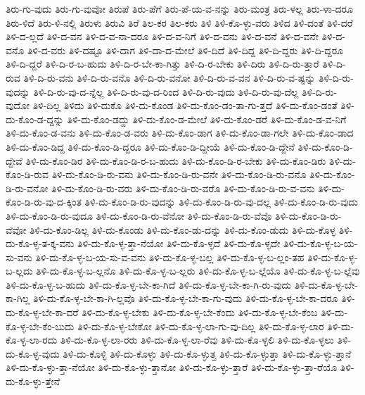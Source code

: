 {ತಿರು-ಗು-ವುದು
ತಿರು-ಗು-ವುವೋ
ತಿರುಪೆ
ತಿರು-ಪೆಗೆ
ತಿರು-ಪೆ-ಯ-ವ-ನನ್ನು
ತಿರು-ಮಂತ್ರ
ತಿರು-ಳಲ್ಲ
ತಿರು-ಳಾ-ದರೂ
ತಿರು-ಳಿದೆ
ತಿರು-ಳಿ-ನಲ್ಲಿ
ತಿರುಳು
ತಿರುವಿ
ತಿರೆ
ತಿಲ-ಕರ
ತಿಲ-ಕರು
ತಿಳಿ
ತಿಳಿ-ಕೊ-ಳ್ಳು-ವರು
ತಿಳಿದ
ತಿಳಿ-ದಂತೆ
ತಿಳಿ-ದರೆ
ತಿಳಿ-ದ-ಲ್ಲದೆ
ತಿಳಿ-ದ-ವನ
ತಿಳಿ-ದ-ವ-ನಾ-ದರೂ
ತಿಳಿ-ದ-ವ-ನಿಗೆ
ತಿಳಿ-ದ-ವನು
ತಿಳಿ-ದ-ವನೆ
ತಿಳಿ-ದ-ವನೇ
ತಿಳಿ-ದ-ವನೊ
ತಿಳಿ-ದ-ವರು
ತಿಳಿ-ದಷ್ಟೂ
ತಿಳಿ-ದಾಗ
ತಿಳಿ-ದಾ-ದ-ಮೇಲೆ
ತಿಳಿ-ದಿದೆ
ತಿಳಿ-ದಿದ್ದ
ತಿಳಿ-ದಿ-ದ್ದರು
ತಿಳಿ-ದಿ-ದ್ದರೂ
ತಿಳಿ-ದಿ-ದ್ದರೆ
ತಿಳಿ-ದಿ-ರ-ಬ-ಹುದು
ತಿಳಿ-ದಿ-ರ-ಬೇ-ಕಾ-ಗಿತ್ತು
ತಿಳಿ-ದಿ-ರ-ಬೇಕು
ತಿಳಿ-ದಿರು
ತಿಳಿ-ದಿ-ರು-ತ್ತಾರೆ
ತಿಳಿ-ದಿ-ರುವ
ತಿಳಿ-ದಿ-ರು-ವನು
ತಿಳಿ-ದಿ-ರು-ವನೊ
ತಿಳಿ-ದಿ-ರು-ವನೋ
ತಿಳಿ-ದಿ-ರು-ವ-ವನ
ತಿಳಿ-ದಿ-ರು-ವ-ಷ್ಟನ್ನು
ತಿಳಿ-ದಿ-ರು-ವುದನ್ನು
ತಿಳಿ-ದಿ-ರು-ವು-ದ-ನ್ನೆಲ್ಲ
ತಿಳಿ-ದಿ-ರು-ವು-ದ-ರಿಂದ
ತಿಳಿ-ದಿ-ರು-ವುದು
ತಿಳಿ-ದಿ-ರು-ವು-ದೆಲ್ಲ
ತಿಳಿ-ದಿ-ರು-ವುದೋ
ತಿಳಿ-ದಿಲ್ಲ
ತಿಳಿದು
ತಿಳಿ-ದುಕೊ
ತಿಳಿ-ದು-ಕೊಂಡ
ತಿಳಿ-ದು-ಕೊಂ-ಡಂ-ತಾ-ಗು-ತ್ತದೆ
ತಿಳಿ-ದು-ಕೊಂ-ಡಂತೆ
ತಿಳಿ-ದು-ಕೊಂ-ಡ-ದ್ದನ್ನು
ತಿಳಿ-ದು-ಕೊಂ-ಡದ್ದು
ತಿಳಿ-ದು-ಕೊಂ-ಡ-ಮೇಲೆ
ತಿಳಿ-ದು-ಕೊಂ-ಡರೆ
ತಿಳಿ-ದು-ಕೊಂ-ಡ-ವ-ನಿಗೆ
ತಿಳಿ-ದು-ಕೊಂ-ಡ-ವನು
ತಿಳಿ-ದು-ಕೊಂ-ಡ-ವರು
ತಿಳಿ-ದು-ಕೊಂ-ಡಾಗ
ತಿಳಿ-ದು-ಕೊಂ-ಡಾ-ಗಲೇ
ತಿಳಿ-ದು-ಕೊಂ-ಡಾದ
ತಿಳಿ-ದು-ಕೊಂ-ಡಿದ್ದ
ತಿಳಿ-ದು-ಕೊಂ-ಡಿ-ದ್ದರೂ
ತಿಳಿ-ದು-ಕೊಂ-ಡಿ-ದ್ದೀಯೆ
ತಿಳಿ-ದು-ಕೊಂ-ಡಿ-ದ್ದೇನೆ
ತಿಳಿ-ದು-ಕೊಂ-ಡಿ-ದ್ದೇವೆ
ತಿಳಿ-ದು-ಕೊಂ-ಡಿರ
ತಿಳಿ-ದು-ಕೊಂ-ಡಿ-ರ-ಬ-ಹುದು
ತಿಳಿ-ದು-ಕೊಂ-ಡಿ-ರ-ಬೇಕು
ತಿಳಿ-ದು-ಕೊಂ-ಡಿರು
ತಿಳಿ-ದು-ಕೊಂ-ಡಿ-ರುವ
ತಿಳಿ-ದು-ಕೊಂ-ಡಿ-ರು-ವನು
ತಿಳಿ-ದು-ಕೊಂ-ಡಿ-ರು-ವನೇ
ತಿಳಿ-ದು-ಕೊಂ-ಡಿ-ರು-ವನೊ
ತಿಳಿ-ದು-ಕೊಂ-ಡಿ-ರು-ವನೋ
ತಿಳಿ-ದು-ಕೊಂ-ಡಿ-ರು-ವರು
ತಿಳಿ-ದು-ಕೊಂ-ಡಿ-ರು-ವರೊ
ತಿಳಿ-ದು-ಕೊಂ-ಡಿ-ರು-ವ-ವನು
ತಿಳಿ-ದು-ಕೊಂ-ಡಿ-ರು-ವು-ದ-ಕ್ಕಿಂತ
ತಿಳಿ-ದು-ಕೊಂ-ಡಿ-ರು-ವುದನ್ನು
ತಿಳಿ-ದು-ಕೊಂ-ಡಿ-ರು-ವು-ದಲ್ಲ
ತಿಳಿ-ದು-ಕೊಂ-ಡಿ-ರು-ವುದು
ತಿಳಿ-ದು-ಕೊಂ-ಡಿ-ರು-ವುದೂ
ತಿಳಿ-ದು-ಕೊಂ-ಡಿ-ರು-ವೆನೋ
ತಿಳಿ-ದು-ಕೊಂ-ಡಿ-ರು-ವೆವೊ
ತಿಳಿ-ದು-ಕೊಂ-ಡಿ-ರು-ವೆವೋ
ತಿಳಿ-ದು-ಕೊಂ-ಡಿಲ್ಲ
ತಿಳಿ-ದು-ಕೊಂಡು
ತಿಳಿ-ದು-ಕೊಂ-ಡು-ದನ್ನು
ತಿಳಿ-ದು-ಕೊಂ-ಡುದು
ತಿಳಿ-ದು-ಕೊಳ್ಳ
ತಿಳಿ-ದು-ಕೊ-ಳ್ಳ-ತ-ಕ್ಕ-ವನು
ತಿಳಿ-ದು-ಕೊ-ಳ್ಳ-ತ್ತಾ-ನೆಯೋ
ತಿಳಿ-ದು-ಕೊ-ಳ್ಳದೆ
ತಿಳಿ-ದು-ಕೊ-ಳ್ಳದೇ
ತಿಳಿ-ದು-ಕೊ-ಳ್ಳ-ಬ-ಯ-ಸು-ವನು
ತಿಳಿ-ದು-ಕೊ-ಳ್ಳ-ಬ-ಯ-ಸು-ವ-ವನು
ತಿಳಿ-ದು-ಕೊ-ಳ್ಳ-ಬಲ್ಲ
ತಿಳಿ-ದು-ಕೊ-ಳ್ಳ-ಬ-ಲ್ಲಂ-ತಹ
ತಿಳಿ-ದು-ಕೊ-ಳ್ಳ-ಬ-ಲ್ಲದು
ತಿಳಿ-ದು-ಕೊ-ಳ್ಳ-ಬ-ಲ್ಲನೊ
ತಿಳಿ-ದು-ಕೊ-ಳ್ಳ-ಬ-ಲ್ಲರು
ತಿಳಿ-ದು-ಕೊ-ಳ್ಳ-ಬ-ಲ್ಲೆಯೊ
ತಿಳಿ-ದು-ಕೊ-ಳ್ಳ-ಬ-ಲ್ಲೆವು
ತಿಳಿ-ದು-ಕೊ-ಳ್ಳ-ಬ-ಹುದು
ತಿಳಿ-ದು-ಕೊ-ಳ್ಳ-ಬೇ-ಕಾ-ಗಿದೆ
ತಿಳಿ-ದು-ಕೊ-ಳ್ಳ-ಬೇ-ಕಾ-ಗಿ-ರು-ವುದು
ತಿಳಿ-ದು-ಕೊ-ಳ್ಳ-ಬೇ-ಕಾ-ಗಿಲ್ಲ
ತಿಳಿ-ದು-ಕೊ-ಳ್ಳ-ಬೇ-ಕಾ-ಗಿ-ಲ್ಲವೊ
ತಿಳಿ-ದು-ಕೊ-ಳ್ಳ-ಬೇ-ಕಾ-ಗು-ವುದು
ತಿಳಿ-ದು-ಕೊ-ಳ್ಳ-ಬೇ-ಕಾ-ದರೂ
ತಿಳಿ-ದು-ಕೊ-ಳ್ಳ-ಬೇ-ಕಾ-ದರೆ
ತಿಳಿ-ದು-ಕೊ-ಳ್ಳ-ಬೇಕು
ತಿಳಿ-ದು-ಕೊ-ಳ್ಳ-ಬೇ-ಕೆಂದು
ತಿಳಿ-ದು-ಕೊ-ಳ್ಳ-ಬೇ-ಕೆಂಬ
ತಿಳಿ-ದು-ಕೊ-ಳ್ಳ-ಬೇ-ಕೆಂ-ಬುದು
ತಿಳಿ-ದು-ಕೊ-ಳ್ಳ-ಬೇಕೋ
ತಿಳಿ-ದು-ಕೊ-ಳ್ಳ-ಲಾ-ಗು-ವು-ದಿಲ್ಲ
ತಿಳಿ-ದು-ಕೊ-ಳ್ಳ-ಲಾರ
ತಿಳಿ-ದು-ಕೊ-ಳ್ಳ-ಲಾ-ರದು
ತಿಳಿ-ದು-ಕೊ-ಳ್ಳ-ಲಾ-ರರು
ತಿಳಿ-ದು-ಕೊ-ಳ್ಳ-ಲಾ-ರೆವು
ತಿಳಿ-ದು-ಕೊ-ಳ್ಳಲಿ
ತಿಳಿ-ದು-ಕೊ-ಳ್ಳಲು
ತಿಳಿ-ದು-ಕೊ-ಳ್ಳ-ವುದು
ತಿಳಿ-ದು-ಕೊಳ್ಳಿ
ತಿಳಿ-ದು-ಕೊಳ್ಳು
ತಿಳಿ-ದು-ಕೊ-ಳ್ಳುತ್ತ
ತಿಳಿ-ದು-ಕೊ-ಳ್ಳುತ್ತಾ
ತಿಳಿ-ದು-ಕೊ-ಳ್ಳು-ತ್ತಾನೆ
ತಿಳಿ-ದು-ಕೊ-ಳ್ಳು-ತ್ತಾ-ನೆಯೋ
ತಿಳಿ-ದು-ಕೊ-ಳ್ಳು-ತ್ತಾನೋ
ತಿಳಿ-ದು-ಕೊ-ಳ್ಳು-ತ್ತಾರೆ
ತಿಳಿ-ದು-ಕೊ-ಳ್ಳು-ತ್ತಾ-ರೆಯೊ
ತಿಳಿ-ದು-ಕೊ-ಳ್ಳು-ತ್ತೇನೆ
}
